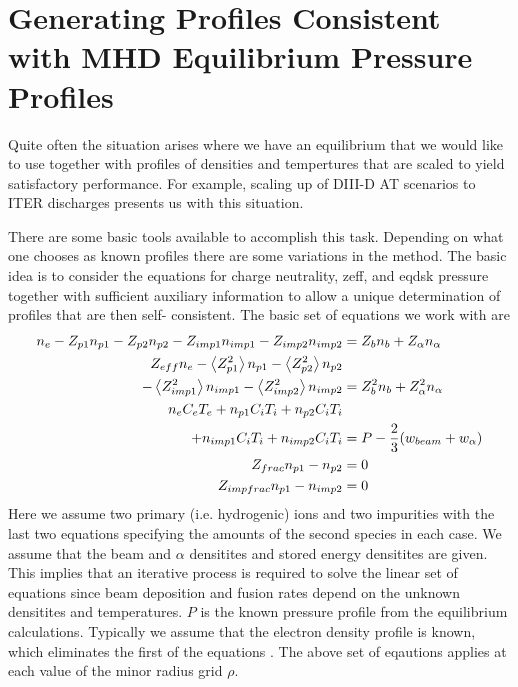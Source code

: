 \normalsize
\section{Generating Profiles Consistent with MHD Equilibrium
Pressure Profiles}
Quite often the situation arises where we have an equilibrium that we would like
to use together with profiles of densities and tempertures that are scaled to
yield satisfactory performance. For example, scaling up of DIII-D AT scenarios
to ITER discharges presents us with this situation.

There are some basic tools available to accomplish this task. Depending on what
one chooses as known profiles there are  some variations in the method. The
basic idea is to consider the equations for charge neutrality, zeff, and eqdsk
pressure together with sufficient auxiliary information to allow a unique
determination of profiles that are then self- consistent. The basic set of
equations we work with are 
\begin{align} \label {zeff-ref}
 n_{e} -Z_{p1}n_{p1}  -Z_{p2}n_{p2}  -Z_{imp1}n_{imp1}
 -Z_{imp2}n_{imp2} &= Z_bn_b +Z_{\alpha}n_{\alpha}\\
 Z_{eff} n_{e} -\left<Z_{p1}^2\right>n_{p1}-\left<Z_{p2}^2\right>n_{p2} \notag
 \\ 
 -\left<Z_{imp1}^2\right>n_{imp1}-\left<Z_{imp2}^2\right>n_{imp2} &=
 Z_b^2n_b +Z_{\alpha}^2n_{\alpha} \\
 n_{e}C_eT_e +n_{p1}C_iT_i+ n_{p2}C_iT_i \notag \\
 +n_{imp1}C_iT_i
 +n_{imp2}C_iT_i &= P - \frac{2}{3}(w_{beam}+w_{\alpha})\\
 Z_{frac}n_{p1} - n_{p2} &= 0 \\
 Z_{impfrac}n_{p1} - n_{imp2} &=0 
\end{align}
Here we assume two primary (i.e. hydrogenic) ions and two impurities with the
last two equations specifying the amounts of the second species in each case. We
assume that the beam and $\alpha$ densitites and stored energy densitites are
given. This implies that an iterative process is required to solve the linear
set of equations since beam deposition and fusion rates depend on the unknown
densitites and temperatures. $P$ is the known pressure profile from the
equilibrium calculations. Typically we assume that the electron density profile
is known, which eliminates the first of the equations . The
above set of eqautions applies at each value of the minor radius grid $\rho $. 
